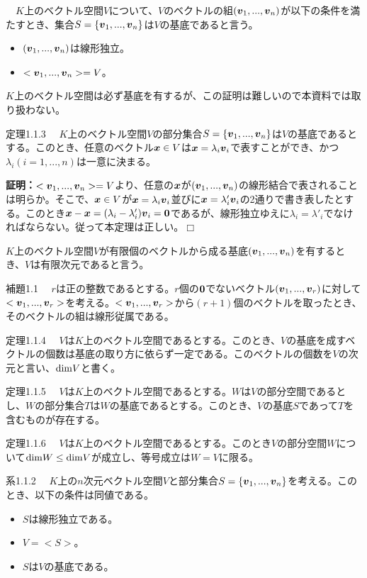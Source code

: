 \documentclass[dvipdfmx, 9pt, a4paper]{jsarticle}
\numberwithin{equation}{subsection}
\newcommand{\bm}[1]{{\mbox{\boldmath $#1$}}}
\def\qed{\hfill $\Box$}
\begin{document}
\begin{tcolorbox}[title=基底]
　$K$上のベクトル空間$V$について、$V$のベクトルの組$(\bm v_1, ..., \bm v_n)$が以下の条件を満たすとき、集合$S=\{ \bm v_1, ..., \bm v_n \}$は$V$の基底であると言う。
\begin{itemize}
\item $(\bm v_1, ..., \bm v_n)$は線形独立。
\item $<\bm v_1, ..., \bm v_n>=V$。
\end{itemize}
\end{tcolorbox}\par
$K$上のベクトル空間は必ず基底を有するが、この証明は難しいので本資料では取り扱わない。
\begin{itembox}[l]{定理1.1.3}
　$K$上のベクトル空間$V$の部分集合$S=\{ \bm v_1, ..., \bm v_n \}$は$V$の基底であるとする。このとき、任意のベクトル$\bm x \in V$は$\bm x=\lambda_i\bm v_i$で表すことができ、かつ$\lambda_i(i=1, ..., n)$は一意に決まる。
\end{itembox}
{\bf 証明：}$<\bm v_1, ..., \bm v_n>=V$より、任意の$\bm x$が$(\bm v_1, ..., \bm v_n)$の線形結合で表されることは明らか。そこで、$\bm x \in V$が$\bm x=\lambda_i\bm v_i$並びに$\bm x=\lambda'_i \bm v_i$の2通りで書き表したとする。このとき$\bm x-\bm x=(\lambda_i-\lambda'_i)\bm v_i=\bm 0$であるが、線形独立ゆえに$\lambda_i=\lambda'_i$でなければならない。従って本定理は正しい。\qed \par
$K$上のベクトル空間$V$が有限個のベクトルから成る基底$(\bm v_1, ..., \bm v_n)$を有するとき、$V$は有限次元であると言う。
\begin{itembox}[l]{補題1.1}
　$r$は正の整数であるとする。$r$個の$\bm 0$でないベクトル$(\bm v_1, ..., \bm v_r)$に対して$<\bm v_1, ..., \bm v_r>$を考える。$<\bm v_1, ..., \bm v_r>$から$(r+1)$個のベクトルを取ったとき、そのベクトルの組は線形従属である。
\end{itembox}
\begin{itembox}[l]{定理1.1.4}
　$V$は$K$上のベクトル空間であるとする。このとき、$V$の基底を成すベクトルの個数は基底の取り方に依らず一定である。このベクトルの個数を$V$の次元と言い、${\rm dim}V$と書く。
\end{itembox}
\begin{itembox}[l]{定理1.1.5}
　$V$は$K$上のベクトル空間であるとする。$W$は$V$の部分空間であるとし、$W$の部分集合$T$は$W$の基底であるとする。このとき、$V$の基底$S$であって$T$を含むものが存在する。
\end{itembox}
\begin{itembox}[l]{定理1.1.6}
　$V$は$K$上のベクトル空間であるとする。このとき$V$の部分空間$W$について${\rm dim}W \leq {\rm dim}V$が成立し、等号成立は$W=V$に限る。
\end{itembox}
\begin{itembox}[l]{系1.1.2}
　$K$上の$n$次元ベクトル空間$V$と部分集合$S=\{ \bm v_1, ..., \bm v_n \}$を考える。このとき、以下の条件は同値である。
\begin{itemize}
\item $S$は線形独立である。
\item $V=<S>$。
\item $S$は$V$の基底である。
\end{itemize}
\end{itembox}
\end{document}
